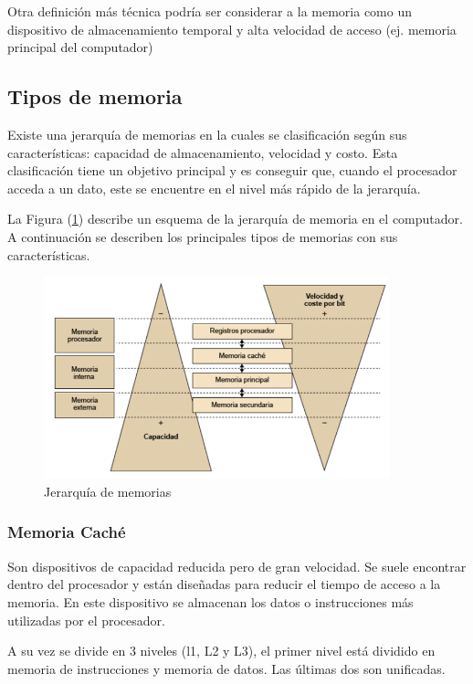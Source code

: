 \documentclass{article}
\begin{document}
Otra definición más técnica podría ser considerar a la memoria como un dispositivo de almacenamiento temporal y alta velocidad de acceso (ej. memoria principal del computador)\cite{Academia}

\subsection{Tipos de memoria}
Existe una jerarquía de memorias en la cuales se clasificación según sus características: capacidad de almacenamiento, velocidad y costo. Esta clasificación tiene un objetivo principal y es conseguir que, cuando el procesador acceda a un dato, este se encuentre en el nivel más rápido de la jerarquía.\cite{Estructura}

La Figura (\ref{fig:Jerarquia}) describe un esquema de la jerarquía de memoria en el computador.
A continuación se describen los principales tipos de memorias con sus características.

\begin{figure}[h]
\includegraphics[width=10cm]{Jerarquia.png}
\centering
\caption{Jerarquía de memorias}
\label{fig:Jerarquia}
\end{figure}

\subsubsection{Memoria Caché}
Son dispositivos de capacidad reducida pero de gran velocidad. Se suele encontrar dentro del procesador y están diseñadas para reducir el tiempo de acceso a la memoria. En este dispositivo se almacenan los datos o instrucciones más utilizadas por el procesador. \cite{Estructura}

A su vez se divide en 3 niveles (l1, L2 y L3), el primer nivel está dividido en memoria de instrucciones y memoria de datos. Las últimas dos son unificadas.
\end{document}
